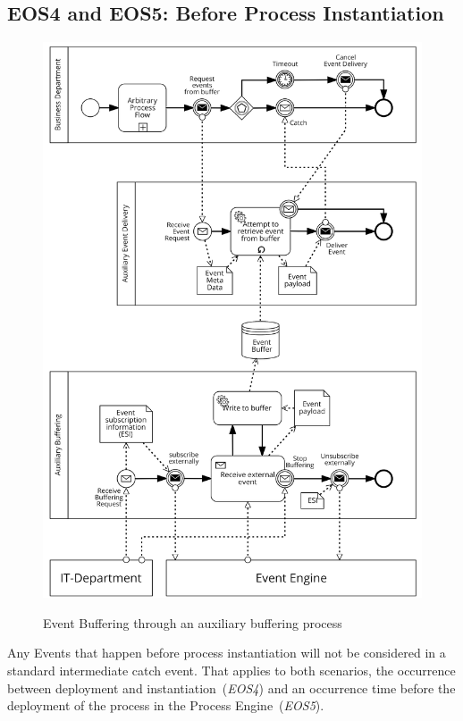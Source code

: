 \subsection*{EOS4 and EOS5: Before Process Instantiation}\label{ass:model:buffered}
\begin{figure}[]
	\myfloatalign
	{\hspace*{-1.0cm}\includegraphics[width=1.2\linewidth]{chapters/assessment/EOS5_buffer_pushing.png}}
	\caption{Event Buffering through an auxiliary buffering process}\label{fig:aux-buffering-process}
\end{figure}

Any Events that happen before process instantiation will not be considered in a standard intermediate catch event. That applies to both scenarios, the occurrence between deployment and instantiation~(\textit{EOS4}) and an occurrence time before the deployment of the process in the Process Engine~(\textit{EOS5}).

